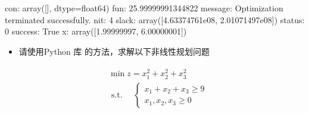 \documentclass[letterpaper,10pt,english]{sphinxmanual}
\begin{document}
\begin{sphinxVerbatim}[commandchars=\\\{\}]
     con: array([], dtype=float64)
     fun: \PYGZhy{}25.99999991344822
 message: \PYGZsq{}Optimization terminated successfully.\PYGZsq{}
     nit: 4
   slack: array([4.63374761e\PYGZhy{}08, 2.01071497e\PYGZhy{}08])
  status: 0
 success: True
       x: array([1.99999997, 6.00000001])
\end{sphinxVerbatim}
\begin{itemize}
\item {} 
请使用Python 库 的方法，求解以下非线性规划问题

\end{itemize}
\begin{equation*}
\begin{split}
\begin{array}{l}
&{\min z= x_{1}^2 + x_{2}^2 +x_{3}^2} \\
&\text { s.t. }{\quad\left\{\begin{array}{l}
{x_1+x_2 + x_3\geq9 } \\ 
{ x_{1}, x_{2},x_3 \geq 0}
\end{array}\right.}\end{array}
\end{split}
\end{equation*}
\end{document}
